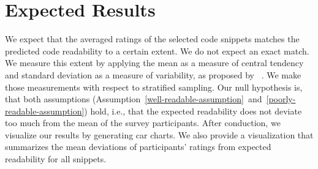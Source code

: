 \documentclass[%
class=scrreprt,
chapterprefix=false,%
open=right,%
twoside=false,%
paper=a4,%
logofile={Logo\_zentral\_farbig\_EN.png},%
thesistype=masterproposal,%
UKenglish,%
]{se2thesis}
\begin{document}
\section{Expected Results}
We expect that the averaged ratings of the selected code snippets matches the predicted code readability to a certain extent. We do not expect an exact match.
We measure this extent by applying the mean as a measure of central tendency and standard deviation as a measure of variability, as proposed by \citeauthor{linaker2015guidelines}~\cite{linaker2015guidelines}. We make those measurements with respect to stratified sampling.
Our null hypothesis is, that both assumptions (Assumption~\ref{well-readable-assumption}~and~\ref{poorly-readable-assumption}) hold, i.e., that the expected readability does not deviate too much from the mean of the survey participants.
After conduction, we visualize our results by generating car charts. We also provide a visualization that summarizes the mean deviations of participants' ratings from expected readability for all snippets.
	
	\backmatter
	
	\printbibliography
	
\end{document}
